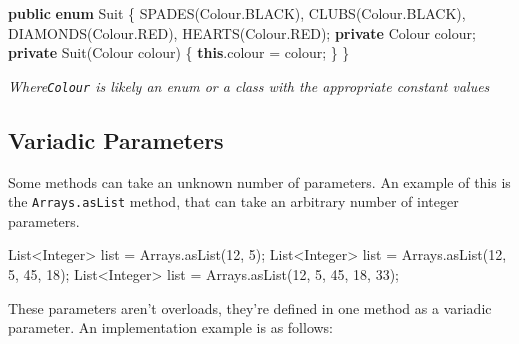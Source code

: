 \documentclass[]{article}
\newenvironment{Shaded}{}{}
\newcommand{\BuiltInTok}[1]{#1}
\newcommand{\DecValTok}[1]{\textcolor[rgb]{0.25,0.63,0.44}{#1}}
\newcommand{\FunctionTok}[1]{\textcolor[rgb]{0.02,0.16,0.49}{#1}}
\newcommand{\KeywordTok}[1]{\textcolor[rgb]{0.00,0.44,0.13}{\textbf{#1}}}
\newcommand{\NormalTok}[1]{#1}
\begin{document}
\begin{Shaded}
\begin{Highlighting}[]
\KeywordTok{public} \KeywordTok{enum}\NormalTok{ Suit \{}
    \FunctionTok{SPADES}\NormalTok{(Colour.}\FunctionTok{BLACK}\NormalTok{),}
    \FunctionTok{CLUBS}\NormalTok{(Colour.}\FunctionTok{BLACK}\NormalTok{),}
    \FunctionTok{DIAMONDS}\NormalTok{(Colour.}\FunctionTok{RED}\NormalTok{),}
    \FunctionTok{HEARTS}\NormalTok{(Colour.}\FunctionTok{RED}\NormalTok{);}
    \KeywordTok{private}\NormalTok{ Colour colour;}
    \KeywordTok{private} \FunctionTok{Suit}\NormalTok{(Colour colour) \{}
        \KeywordTok{this}\NormalTok{.}\FunctionTok{colour}\NormalTok{ = colour;}
\NormalTok{    \}}
\NormalTok{\}}
\end{Highlighting}
\end{Shaded}

\emph{Where\texttt{Colour} is likely an enum or a class with the
appropriate constant values}

\hypertarget{variadic-parameters}{%
\subsection{Variadic Parameters}\label{variadic-parameters}}

Some methods can take an unknown number of parameters. An example of
this is the \texttt{Arrays.asList} method, that can take an arbitrary
number of integer parameters.

\begin{Shaded}
\begin{Highlighting}[]
\BuiltInTok{List}\NormalTok{<}\BuiltInTok{Integer}\NormalTok{> list = }\BuiltInTok{Arrays}\NormalTok{.}\FunctionTok{asList}\NormalTok{(}\DecValTok{12}\NormalTok{, }\DecValTok{5}\NormalTok{);}
\BuiltInTok{List}\NormalTok{<}\BuiltInTok{Integer}\NormalTok{> list = }\BuiltInTok{Arrays}\NormalTok{.}\FunctionTok{asList}\NormalTok{(}\DecValTok{12}\NormalTok{, }\DecValTok{5}\NormalTok{, }\DecValTok{45}\NormalTok{, }\DecValTok{18}\NormalTok{);}
\BuiltInTok{List}\NormalTok{<}\BuiltInTok{Integer}\NormalTok{> list = }\BuiltInTok{Arrays}\NormalTok{.}\FunctionTok{asList}\NormalTok{(}\DecValTok{12}\NormalTok{, }\DecValTok{5}\NormalTok{, }\DecValTok{45}\NormalTok{, }\DecValTok{18}\NormalTok{, }\DecValTok{33}\NormalTok{);}
\end{Highlighting}
\end{Shaded}

These parameters aren't overloads, they're defined in one method as a
variadic parameter. An implementation example is as follows:
\end{document}
